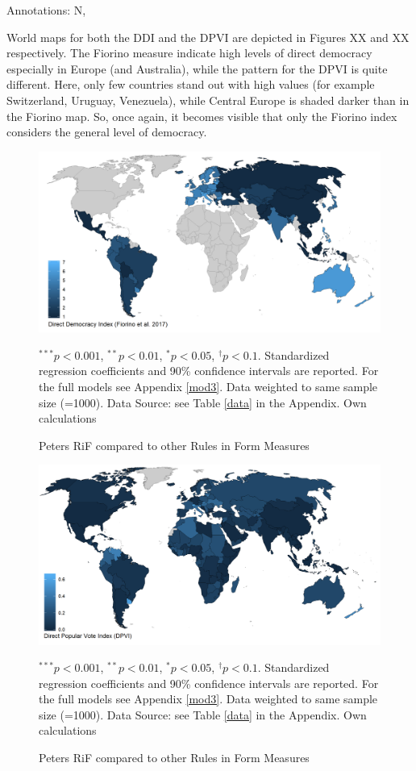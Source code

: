 \documentclass{systats}
\begin{document}
Annotations: N, 

World maps for both the DDI and the DPVI are depicted in Figures XX and XX respectively. The Fiorino measure indicate high levels of direct democracy especially in Europe (and Australia), while the pattern for the DPVI is quite different. Here, only few countries stand out with high values (for example Switzerland, Uruguay, Venezuela), while Central Europe is shaded darker than in the Fiorino map. So, once again, it becomes visible that only the Fiorino index considers the general level of democracy. 

\begin{figure}
	\caption{Peters RiF compared to other Rules in Form Measures}
	\label{reg2}
	\includegraphics[width=\textwidth]{images/map_fiorini_fin.png}
	\flushright
	{\scriptsize $^{***}p<0.001$, $^{**}p<0.01$, $^*p<0.05$, $^{\dagger}p<0.1$. Standardized regression coefficients and 90\% confidence intervals are reported. For the full models see Appendix \ref{mod3}. Data weighted to same sample size (=1000). Data Source: see Table \ref{data} in the Appendix. Own calculations  \par}
\end{figure}
\begin{figure}
	\caption{Peters RiF compared to other Rules in Form Measures}
	\label{reg2}
	\includegraphics[width=\textwidth]{images/map_altmann_fin.png}
	\flushright
	{\scriptsize $^{***}p<0.001$, $^{**}p<0.01$, $^*p<0.05$, $^{\dagger}p<0.1$. Standardized regression coefficients and 90\% confidence intervals are reported. For the full models see Appendix \ref{mod3}. Data weighted to same sample size (=1000). Data Source: see Table \ref{data} in the Appendix. Own calculations  \par}
\end{figure}
\end{document}
